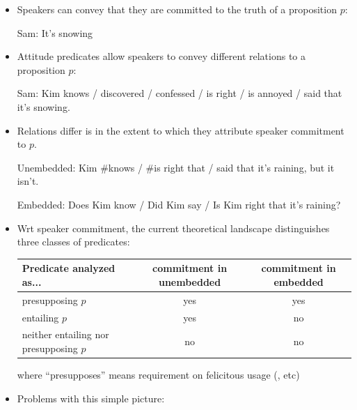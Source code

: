 \documentclass[11pt,fleqn]{article}
\newcommand{\6}{\mbox{$[\hspace*{-.6mm}[$}}
\newcommand{\9}{\mbox{$]\hspace*{-.6mm}]$}}
\begin{document}
\begin{itemize}[leftmargin=5ex,topsep=0pt,itemsep=-2pt]

\item Speakers can convey that they are committed to the truth of a proposition $p$:

\begin{exe}
\ex Sam: It's snowing
\end{exe}


\item Attitude predicates allow speakers to convey different relations to a proposition $p$:

\begin{exe}
\ex Sam: Kim knows / discovered / confessed / is right / is annoyed / said that it's snowing.

\end{exe}

\item Relations differ is in the extent to which they attribute speaker commitment to $p$.

\begin{exe}
\ex
\begin{xlist}
\ex Unembedded: Kim \#knows / \#is right that / said that it's raining, but it isn't.

\ex Embedded: Does Kim know / Did Kim say / Is Kim right that it's raining? 

\end{xlist}
\end{exe}

\item Wrt speaker commitment, the current theoretical landscape distinguishes three classes of predicates: 

\begin{tabular}{l|cc}
Predicate analyzed as... & commitment in unembedded & commitment in embedded \\ \hline
presupposing $p$ & yes & yes \\
entailing $p$  & yes & no \\
neither entailing nor presupposing $p$ & no & no \\
\end{tabular}

where ``presupposes'' means requirement on felicitous usage (\citealt{heim83,vds92}, etc)

\item Problems with this simple picture:

\begin{enumerate}[leftmargin=5ex,topsep=0pt,itemsep=-2pt]


\end{enumerate}
\end{itemize}
\end{document}

